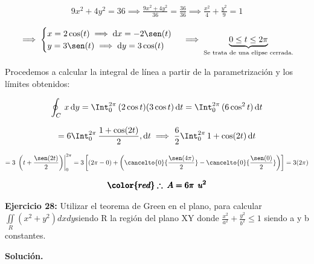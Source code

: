 \documentclass[12pt]{article}
\begin{document}
\begin{align*}
	9x^2 + 4y^2 = 36 \implies \frac{9x^2 + 4y^2}{36} = \frac{36}{36} \implies \frac{x^2}{4} + \frac{y^2}{9} = 1
\end{align*}

\begin{align*}
	\implies \begin{cases}
		x = 2\cos(t) \implies \mathrm{d}x = -2\sen(t)\\
		y = 3\sen(t) \implies \mathrm{d}y = 3\cos(t)\\
	\end{cases} \implies \underbrace{0 \leq t \leq 2\pi}_{\text{Se trata de una elipse cerrada.}}
\end{align*}

\noindent Procedemos a calcular la integral de línea a partir de la parametrización y los límites obtenidos:

\begin{align*}
	\oint_C\, x\,\mathrm{d}y = \Int_{0}^{2\pi}\, (2\cos t)(3\cos t)\,\mathrm{d}t = \Int_{0}^{2\pi}\, (6\cos^2 t)\,\mathrm{d}t
\end{align*}

\begin{align*}
	= 6\Int_{0}^{2\pi}\, \frac{1+\cos(2t)}{2},\mathrm{d}t
	\implies \frac{6}{2}\Int_{0}^{2\pi}\, 1+\cos(2t)\,\mathrm{d}t
\end{align*}

\begin{align*}
	= 3\,\left.\left(t + \frac{\sen(2t)}{2}\right)\right|_{0}^{2\pi} = 3\left[ \left(2\pi - 0\right) + \left( \cancelto{0}{\frac{\sen(4\pi)}{2}} - \cancelto{0}{\frac{\sen(0)}{2}} \right) \right] = 3(2\pi)
\end{align*}

\begin{align*}
	\pmb{\color{red} \therefore\: A = 6\pi\: \: u^2}
\end{align*}

\noindent \textbf{Ejercicio 28:} Utilizar el teorema de Green en el plano, para calcular $\iint\limits_{R}{({{x}^{2}}+{{y}^{2}})dxdy}$siendo R la región del plano XY donde  $\frac{{{x}^{2}}}{{{a}^{2}}}+\frac{{{y}^{2}}}{{{b}^{2}}}\le 1$ siendo a y b constantes.

\vspace{5mm}

\noindent \textbf{Solución.}
\end{document}
